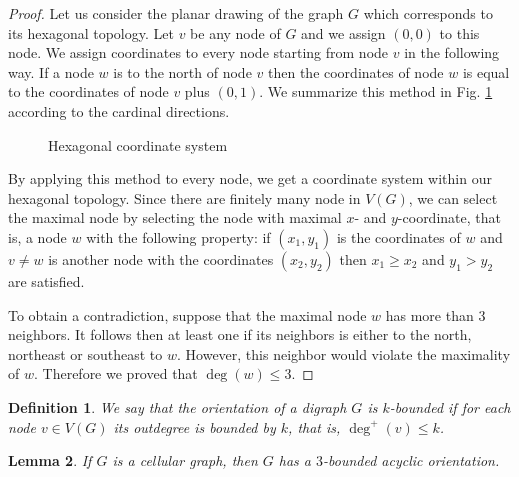 \documentclass[a4paper, 12pt]{article}
\newtheorem{lem}{Lemma}[section]
\newtheorem{defin}[lem]{Definition}
\begin{document}
\begin{proof} Let us consider the planar drawing of the graph $G$ which corresponds to its hexagonal topology.
Let $v$ be any node of $G$ and we assign $(0,0)$ to this node. We assign coordinates to every node starting from node $v$ in the following way. If a node $w$ is to the north of node $v$ then the coordinates of node $w$ is equal to the coordinates of node $v$ plus $(0,1)$. We summarize this method in Fig. \ref{fig:assignment} according to the cardinal directions.
\begin{figure}[!h]
\centering
\caption{Hexagonal coordinate system}\label{fig:assignment}
\end{figure}
By applying this method to every node, we get a coordinate system within our hexagonal topology. Since there are finitely many node in $V(G)$, we can select the maximal node by selecting the node with maximal $x$- and $y$-coordinate, that is, a node $w$ with the following property: if $(x_1,y_1)$ is the coordinates of $w$ and $v \neq w$ is another node with the coordinates $(x_2,y_2)$ then $x_1 \geqslant x_2$ and $y_1 > y_2$ are satisfied.

To obtain a contradiction, suppose that the maximal node $w$ has more than 3 neighbors. It follows then at least one if its neighbors is either to the north, northeast or southeast to $w$. However, this neighbor would violate the maximality of $w$. Therefore we proved that $\deg(w) \leqslant 3$.
\end{proof}
\begin{defin}
We say that the orientation of a digraph $G$ is $k$\textit{-bounded} if for each node $v \in V(G)$ its outdegree is bounded by $k$, that is, $\deg^+(v) \leqslant k$.
\end{defin}
\begin{lem}\label{lem:bounded-acyclic-orientation}
If $G$ is a cellular graph, then $G$ has a $3$-bounded acyclic orientation.
\end{lem}
\end{document}

